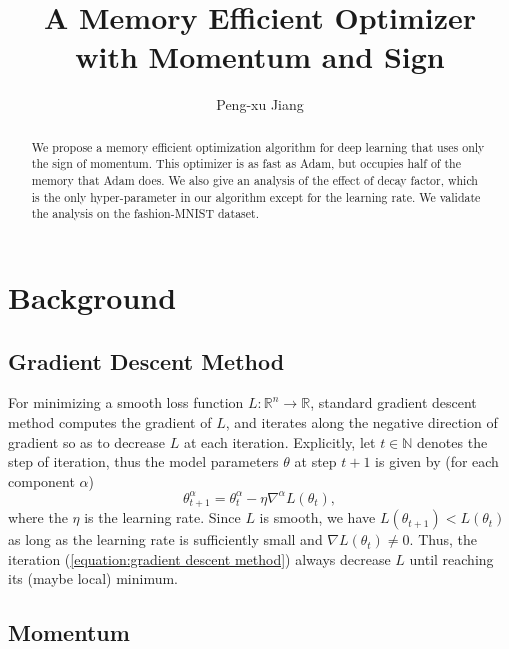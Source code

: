 \documentclass[superscriptaddress,twocolumn,aps,prd,10pt,nofootinbib,preprintnumbers]{revtex4-2}
\begin{document}
\title{A Memory Efficient Optimizer with Momentum and Sign}

\author{Peng-xu Jiang}

\begin{abstract}
  We propose a memory efficient optimization algorithm for deep learning that
  uses only the sign of momentum. This optimizer is as fast as Adam, but
  occupies half of the memory that Adam does. We also give an analysis of the
  effect of decay factor, which is the only hyper-parameter in our algorithm
  except for the learning rate. We validate the analysis on the fashion-MNIST
  dataset.
\end{abstract}

\maketitle

\section{Background}

\subsection{Gradient Descent Method}

For minimizing a smooth loss function $L : \mathbb{R}^n \rightarrow
\mathbb{R}$, standard gradient descent method computes the gradient of $L$,
and iterates along the negative direction of gradient so as to decrease $L$ at
each iteration. Explicitly, let $t \in \mathbb{N}$ denotes the step of
iteration, thus the model parameters $\theta$ at step $t + 1$ is given by (for
each component $\alpha$)
\begin{equation}
  \theta^{\alpha}_{t + 1} = \theta_t^{\alpha} - \eta \nabla^{\alpha} L
  (\theta_t), \label{equation:gradient descent method}
\end{equation}
where the $\eta$ is the learning rate. Since $L$ is smooth, we have $L
(\theta_{t + 1}) < L (\theta_t)$ as long as the learning rate is sufficiently
small and $\nabla L (\theta_t) \neq 0$. Thus, the iteration
(\ref{equation:gradient descent method}) always decrease $L$ until reaching
its (maybe local) minimum.

\subsection{Momentum}
\end{document}
